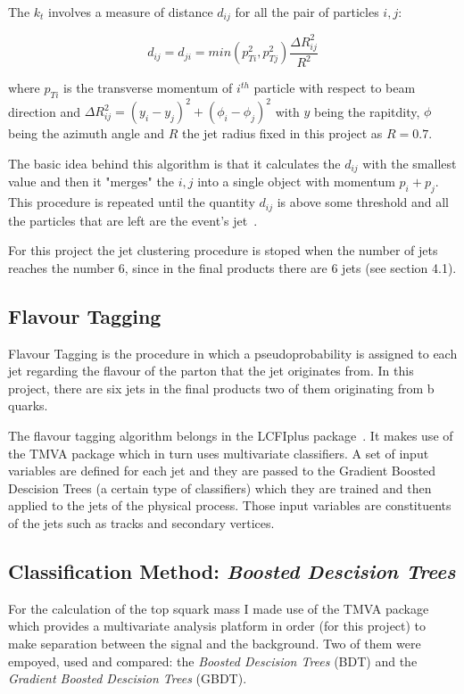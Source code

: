 \documentclass[12pt,a4paper]{report}
\begin{document}
The $k_{t}$ involves a measure of distance $d_{ij}$ for all the pair of particles $i,j$:

\begin{equation}
 d_{ij}=d_{ji}=min(p_{Ti}^{2},p_{Tj}^{2})\frac{\Delta R^{2}_{ij}}{R^{2}}
\end{equation}


where $p_{Ti}$ is the transverse momentum of $i^{th}$ particle with respect to beam direction and 
$\Delta R^{2}_{ij}=(y_{i}-y_{j})^{2}+(\phi_{i}-\phi_{j})^{2}$ with $y$ being the rapitdity, $\phi$ being
the azimuth angle and $R$ the jet radius fixed in this project as $R=0.7$.

The basic idea behind this algorithm is that it calculates the $d_{ij}$ with the smallest value and then it 
"merges" the $i,j$ into a single object with momentum $p_{i}+p_{j}$. This procedure is repeated until the quantity
$d_{ij}$ is above some threshold and all the particles that are left are the event's jet~\cite{cacciari2012fastjet}.

For this project the jet clustering procedure is stoped when the number of jets reaches the number 
6, since in the final products there are 6 jets (see section 4.1).
\subsection{Flavour Tagging}

Flavour Tagging is the procedure in which a pseudoprobability is assigned to each jet regarding the
flavour of the parton
that the jet originates from. In this project, there are six jets in the final products two of them 
originating from b quarks. 

The flavour tagging algorithm belongs in the LCFIplus package~\cite{suehara2016lcfiplus}.
It  makes use of the TMVA package which in turn uses multivariate classifiers. A set of input variables are 
defined for each jet and they are passed to the Gradient Boosted Descision Trees (a certain type of classifiers)
which they are trained and then applied to the jets of the physical process. Those input variables are
constituents of the jets such as tracks and secondary vertices.

\subsection{Classification Method: \textit{Boosted Descision Trees}}

For the calculation of the top squark mass I made use of the TMVA package which provides a multivariate 
analysis platform in order (for this project) to make separation between the signal and the background. Two 
of them were empoyed, used and compared: the \textit{Boosted Descision Trees} (BDT) and the 
\textit{Gradient Boosted Descision Trees} (GBDT).
\end{document}
